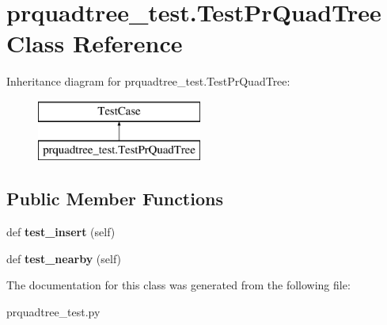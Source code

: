 \hypertarget{classprquadtree__test_1_1TestPrQuadTree}{}\section{prquadtree\+\_\+test.\+Test\+Pr\+Quad\+Tree Class Reference}
\label{classprquadtree__test_1_1TestPrQuadTree}
Inheritance diagram for prquadtree\+\_\+test.\+Test\+Pr\+Quad\+Tree\+:\begin{figure}[H]
\begin{center}
\leavevmode
\includegraphics[height=2.000000cm]{classprquadtree__test_1_1TestPrQuadTree}
\end{center}
\end{figure}
\subsection*{Public Member Functions}
\begin{DoxyCompactItemize}
\item 
\hypertarget{classprquadtree__test_1_1TestPrQuadTree_aa6b769cba631fb54c2576a35eb6f0681}{}def {\bfseries test\+\_\+insert} (self)\label{classprquadtree__test_1_1TestPrQuadTree_aa6b769cba631fb54c2576a35eb6f0681}

\item 
\hypertarget{classprquadtree__test_1_1TestPrQuadTree_a6f5d504b57cae103ee89f7d347df9be4}{}def {\bfseries test\+\_\+nearby} (self)\label{classprquadtree__test_1_1TestPrQuadTree_a6f5d504b57cae103ee89f7d347df9be4}

\end{DoxyCompactItemize}


The documentation for this class was generated from the following file\+:\begin{DoxyCompactItemize}
\item 
prquadtree\+\_\+test.\+py\end{DoxyCompactItemize}
